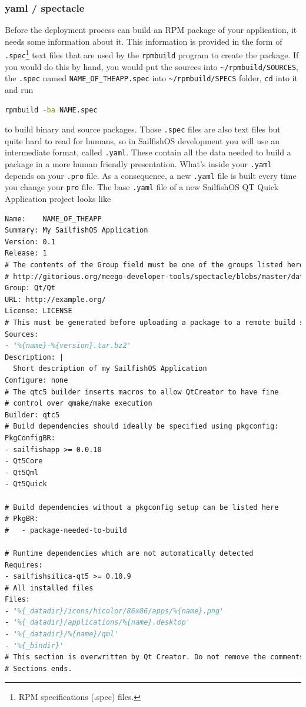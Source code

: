 \subsubsection{yaml / spectacle}\label{subsubsec:spectacleyaml}
%
Before the deployment process can build an RPM package of your application, it needs some information about it. This information is provided in the form of \verb,.spec,\footnote{RPM specifications (.spec) files.} text files that are used by the \verb,rpmbuild, program to create the package. If you would do this by hand, you would put the sources into \verb,~/rpmbuild/SOURCES,, the \verb,.spec, named \verb,NAME_OF_THEAPP.spec, into \verb,~/rpmbuild/SPECS, folder, \verb,cd, into it and run
%
\begin{lstlisting}[language=bash]
rpmbuild -ba NAME.spec
\end{lstlisting}
%
to build binary and source packages. Those \verb,.spec, files are also text files but quite hard to read for humans, so in SailfishOS development you will use an intermediate format, called \verb,.yaml,. These contain all the data needed to build a package in a more human friendly presentation. What's inside your \verb,.yaml, depends on your \verb,.pro, file. As a consequence, a new \verb,.yaml, file is built every time you change your \verb.pro. file. The base \verb,.yaml, file of a new SailfishOS QT Quick Application project looks like
%
\begin{lstlisting}[language=tex]
Name:    NAME_OF_THEAPP
Summary: My SailfishOS Application
Version: 0.1
Release: 1
# The contents of the Group field must be one of the groups listed here:
# http://gitorious.org/meego-developer-tools/spectacle/blobs/master/data/GROUPS
Group: Qt/Qt
URL: http://example.org/
License: LICENSE
# This must be generated before uploading a package to a remote build service
Sources:
- '%{name}-%{version}.tar.bz2'
Description: |
  Short description of my SailfishOS Application
Configure: none
# The qtc5 builder inserts macros to allow QtCreator to have fine
# control over qmake/make execution
Builder: qtc5
# Build dependencies should ideally be specified using pkgconfig:
PkgConfigBR:
- sailfishapp >= 0.0.10
- Qt5Core
- Qt5Qml
- Qt5Quick

# Build dependencies without a pkgconfig setup can be listed here
# PkgBR:
#   - package-needed-to-build

# Runtime dependencies which are not automatically detected
Requires:
- sailfishsilica-qt5 >= 0.10.9
# All installed files
Files:
- '%{_datadir}/icons/hicolor/86x86/apps/%{name}.png'
- '%{_datadir}/applications/%{name}.desktop'
- '%{_datadir}/%{name}/qml'
- '%{_bindir}'
# This section is overwritten by Qt Creator. Do not remove the comments.
# Sections ends.
\end{lstlisting}

